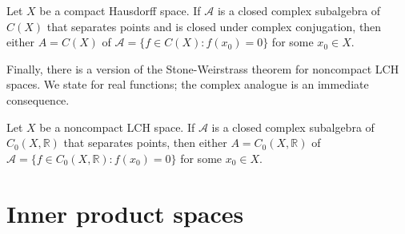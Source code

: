 \documentclass{article}
\theoremstyle{definition}
\numberwithin{equation}{section}
\newcommand{\R}{\mathbb{R}}
\begin{document}
	\begin{thm}
		Let $X$ be a compact Hausdorff space. If $\mathcal{A}$ is a closed complex subalgebra of $C(X)$ that separates points and is closed under complex conjugation, then either $A=C(X)$ of $\mathcal{A}=\{f\in C(X):f(x_0)=0\}$ for some $x_0\in X$.
	\end{thm}
	Finally, there is a version of the Stone-Weirstrass theorem for noncompact LCH spaces. We state for real functions; the complex analogue is an immediate consequence.
	\begin{thm}
		Let $X$ be a noncompact LCH space. If $\mathcal{A}$ is a closed complex subalgebra of $C_0(X,\R)$ that separates points, then either $A=C_0(X,\R)$ of $\mathcal{A}=\{f\in C_0(X,\R):f(x_0)=0\}$ for some $x_0\in X$.
	\end{thm}
	
	\clearpage
	\section{Inner product spaces}
\end{document}
